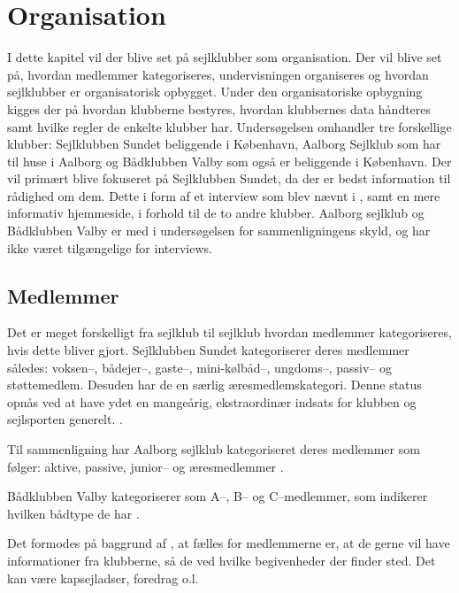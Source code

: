 \chapter{Organisation}\label{chap:organisation}

I dette kapitel vil der blive set på sejlklubber som organisation. Der vil blive set på, hvordan medlemmer
kategoriseres, undervisningen organiseres og hvordan sejlklubber er organisatorisk opbygget. Under den
organisatoriske opbygning kigges der på hvordan klubberne bestyres, hvordan klubbernes data håndteres samt
hvilke regler de enkelte klubber har. Undersøgelsen omhandler tre forskellige klubber: Sejlklubben Sundet
beliggende i København, Aalborg Sejlklub  som har til huse i Aalborg
og Bådklubben Valby som også er beliggende i København. Der vil primært blive fokuseret på Sejlklubben Sundet,
da der er bedst information til rådighed om dem. Dette i form af et interview som blev nævnt i
, samt en mere informativ hjemmeside, i forhold til de to
andre klubber. Aalborg sejlklub og Bådklubben Valby er med i undersøgelsen for sammenligningens skyld, og har
ikke været tilgængelige for interviews.


\section{Medlemmer}\label{sec:organisation-medlemmer}

Det er meget forskelligt fra sejlklub til sejlklub hvordan medlemmer kategoriseres, hvis dette bliver gjort.
Sejlklubben Sundet kategoriserer deres medlemmer således: voksen--, bådejer--, gaste--, mini-kølbåd--,
ungdoms--, passiv-- og støttemedlem. Desuden har de en særlig æresmedlemskategori. Denne status opnås ved at
have ydet en mangeårig, ekstraordinær indsats for klubben og sejlsporten generelt. \citep{sundet_vedtaegter}.

Til sammenligning har Aalborg sejlklub kategoriseret deres medlemmer som følger: aktive, passive, junior-- og
æresmedlemmer \citep{aalborg_sejlklub_vedtaegter}.

Bådklubben Valby kategoriserer som A--, B-- og C--medlemmer, som indikerer hvilken bådtype de har
\citep{badklubben_valby_love}.

Det formodes på baggrund af , at fælles for medlemmerne er, at de gerne vil have
informationer fra klubberne, så de ved hvilke begivenheder der
finder sted. Det kan være kapsejladser, foredrag o.l.


